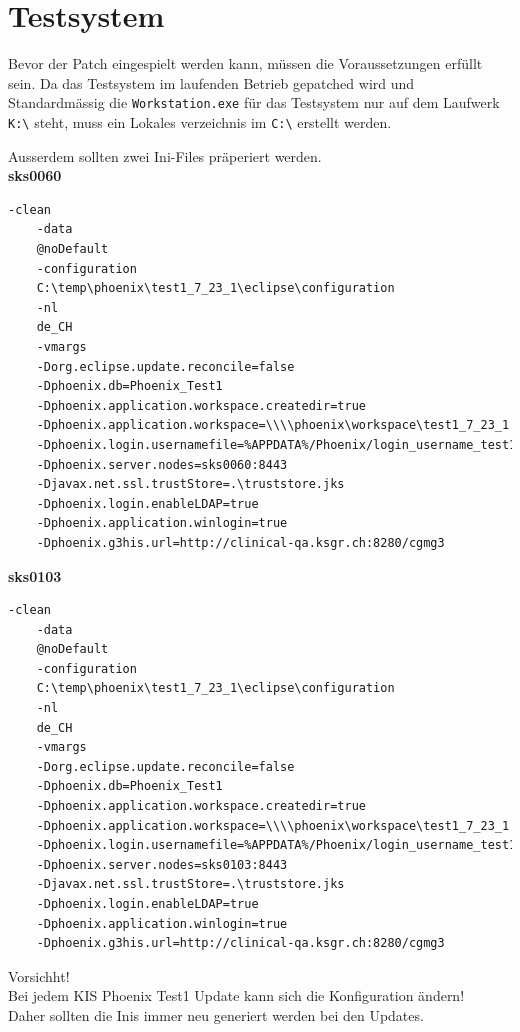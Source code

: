 
\chapter{Testsystem}
\begin{flushleft}
    Bevor der Patch eingespielt werden kann, müssen die Voraussetzungen erfüllt sein.
    Da das Testsystem im laufenden Betrieb gepatched wird und Standardmässig die \texttt{Workstation.exe} für das Testsystem nur auf dem Laufwerk \texttt{K:\textbackslash} steht, muss ein Lokales verzeichnis im \texttt{C:\textbackslash} erstellt werden.
\end{flushleft}
\begin{flushleft}
    Ausserdem sollten zwei Ini-Files präperiert werden.\\
    \textbf{sks0060}\\
    \lstset{style=gra_codestyle}
    \begin{lstlisting}[language=sh, caption=Workstation.ini TEST sks0060,captionpos=b,label={lst:workstation.ini-test-sks0060},breaklines=true]
    -clean
    -data
    @noDefault
    -configuration
    C:\temp\phoenix\test1_7_23_1\eclipse\configuration
    -nl
    de_CH
    -vmargs
    -Dorg.eclipse.update.reconcile=false
    -Dphoenix.db=Phoenix_Test1
    -Dphoenix.application.workspace.createdir=true
    -Dphoenix.application.workspace=\\\\phoenix\workspace\test1_7_23_1
    -Dphoenix.login.usernamefile=%APPDATA%/Phoenix/login_username_test1
    -Dphoenix.server.nodes=sks0060:8443
    -Djavax.net.ssl.trustStore=.\truststore.jks
    -Dphoenix.login.enableLDAP=true
    -Dphoenix.application.winlogin=true
    -Dphoenix.g3his.url=http://clinical-qa.ksgr.ch:8280/cgmg3
    \end{lstlisting}
    \textbf{sks0103}\\
    \lstset{style=gra_codestyle}
    \begin{lstlisting}[language=sh, caption=Workstation.ini TEST sks0103,captionpos=b,label={lst:workstation.ini-test-sks0103},breaklines=true]
    -clean
    -data
    @noDefault
    -configuration
    C:\temp\phoenix\test1_7_23_1\eclipse\configuration
    -nl
    de_CH
    -vmargs
    -Dorg.eclipse.update.reconcile=false
    -Dphoenix.db=Phoenix_Test1
    -Dphoenix.application.workspace.createdir=true
    -Dphoenix.application.workspace=\\\\phoenix\workspace\test1_7_23_1
    -Dphoenix.login.usernamefile=%APPDATA%/Phoenix/login_username_test1
    -Dphoenix.server.nodes=sks0103:8443
    -Djavax.net.ssl.trustStore=.\truststore.jks
    -Dphoenix.login.enableLDAP=true
    -Dphoenix.application.winlogin=true
    -Dphoenix.g3his.url=http://clinical-qa.ksgr.ch:8280/cgmg3
    \end{lstlisting}
    \begin{mdframed}
    Vorsichht!\\Bei jedem KIS Phoenix Test1 Update kann sich die Konfiguration ändern!\\Daher sollten die Inis immer neu generiert werden bei den Updates.
    \end{mdframed}
\end{flushleft}
